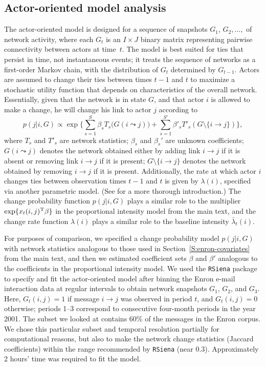 \documentclass[final]{statsoc}
\begin{document}
\subsection{Actor-oriented model analysis}\label{sec:actor-oriented}

The actor-oriented model is designed for a sequence of snapshots $G_1$,
$G_2,\dotsc,$ of network activity, where each $G_t$ is an $I \times J$ binary
matrix representing pairwise connectivity between actors at time~$t$.  The
model is best suited for ties that persist in time, not instantaneous events;
it treats the sequence of networks as a first-order Markov chain, with the
distribution of $G_t$ determined by $G_{t-1}$.  Actors are assumed to change
their ties between times $t-1$ and $t$ to maximize a stochastic utility
function that depends on characteristics of the overall network.  Essentially,
given that the network is in state $G$, and that actor $i$ is allowed to make
a change, he will change his link to actor $j$ according to
\[
  p(j | i, G) \propto
    \exp\Big\{ \sum_{s=1}^S \beta_s T_s\big(G(i \leadsto j)\big)
      +
        \sum_{s=1}^{S'} \beta'_s T'_s(G \setminus \{ i \to j\})
    \Big\},
\]
where $T_s$ and $T'_s$ are network statistics; $\beta_s$ and $\beta_s'$ are
unknown coefficients; $G(i \leadsto j)$ denotes the network obtained either by
adding link $i \to j$ if it is absent or removing link $i \to j$ if it is
present; $G \setminus \{ i \to j \}$ denotes the network obtained by removing
$i \to j$ if it is present.  Additionally, the rate at which actor $i$ changes
ties between observation times $t-1$ and $t$ is given by $\lambda(i)$,
specified via another parametric model.  (See \citet{snijders2010introduction}
for a more thorough introduction.)  The change probability function $p(j | i,
G)$ plays a similar role to the multiplier $\exp\{ x_t(i,j)^{\mathrm{T}} \beta \}$
in the proportional intensity model from the main text, and the change rate function $\lambda(i)$
plays a similar role to the baseline intensity $\bar \lambda_t(i)$.

For purposes of comparison, we specified a change probability model $p(j | i,
G)$ with network statistics analogous to those used in
Section~\ref{S:enron-covariates} from the main text, and then we estimated coefficient sets
$\beta$ and $\beta'$ analogous to the coefficients in the proportional intensity
model.  We used the \texttt{RSiena} package \citep{rsiena2011} to specify and
fit the actor-oriented model after binning the Enron e-mail interaction data
at regular intervals to obtain network snapshots $G_1$, $G_2$, and $G_3$.
Here, $G_t(i,j) = 1$ if message $i \to j$ was observed in period $t$, and
$G_t(i,j) = 0$ otherwise; periods 1--3 correspond to consecutive four-month
periods in the year 2001.   The subset we looked at contains 60\% of the
messages in the Enron corpus.  We chose this particular subset and temporal
resolution partially for computational reasons, but also to make the network
change statistics (Jaccard coefficients) within the range recommended by
\texttt{RSiena} (near $0.3$).  Approximately 2 hours' time was required to fit
the model.
\end{document}
